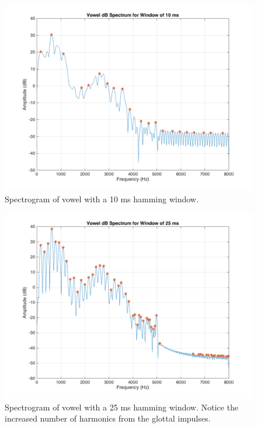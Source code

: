 \documentclass{article}
\begin{document}
\begin{figure}[h]
  \centering
    \includegraphics[width=.4\textheight]{vowel_spec_win_10.png}
  \caption{Spectrogram of vowel with a 10 ms hamming window.}
  \label{fig:vowel_spec_win_10}
\end{figure}
\begin{figure}[h]
  \centering
    \includegraphics[width=.4\textheight]{vowel_spec_win_25.png}
  \caption{Spectrogram of vowel with a 25 ms hamming window. Notice the increased number of harmonics from the glottal impulses.}
  \label{fig:vowel_spec_win_25}
\end{figure}
\end{document}
